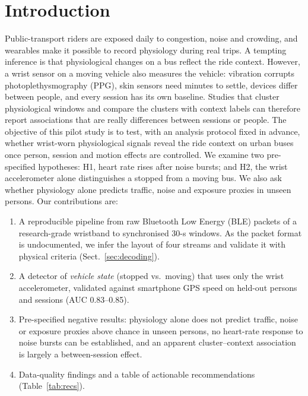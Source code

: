 \documentclass[runningheads]{llncs}
\begin{document}
\section{Introduction}
Public-transport riders are exposed daily to congestion, noise and crowding, and wearables make it possible to record physiology during real trips. A tempting inference is that physiological changes on a bus reflect the ride context. However, a wrist sensor on a moving vehicle also measures the vehicle: vibration corrupts photoplethysmography (PPG), skin sensors need minutes to settle, devices differ between people, and every session has its own baseline. Studies that cluster physiological windows and compare the clusters with context labels can therefore report associations that are really differences between sessions or people. The objective of this pilot study is to test, with an analysis protocol fixed in advance, whether wrist-worn physiological signals reveal the ride context on urban buses once person, session and motion effects are controlled. We examine two pre-specified hypotheses: H1, heart rate rises after noise bursts; and H2, the wrist accelerometer alone distinguishes a stopped from a moving bus. We also ask whether physiology alone predicts traffic, noise and exposure proxies in unseen persons. Our contributions are:
\begin{enumerate}
\item A reproducible pipeline from raw Bluetooth Low Energy (BLE) packets of a research-grade wristband to synchronised 30-s windows. As the packet format is undocumented, we infer the layout of four streams and validate it with physical criteria (Sect.~\ref{sec:decoding}).
\item A detector of \emph{vehicle state} (stopped vs.\ moving) that uses only the wrist accelerometer, validated against smartphone GPS speed on held-out persons and sessions (AUC 0.83--0.85).
\item Pre-specified negative results: physiology alone does not predict traffic, noise or exposure proxies above chance in unseen persons, no heart-rate response to noise bursts can be established, and an apparent cluster--context association is largely a between-session effect.
\item Data-quality findings and a table of actionable recommendations (Table~\ref{tab:recs}).
\end{enumerate}
\end{document}
